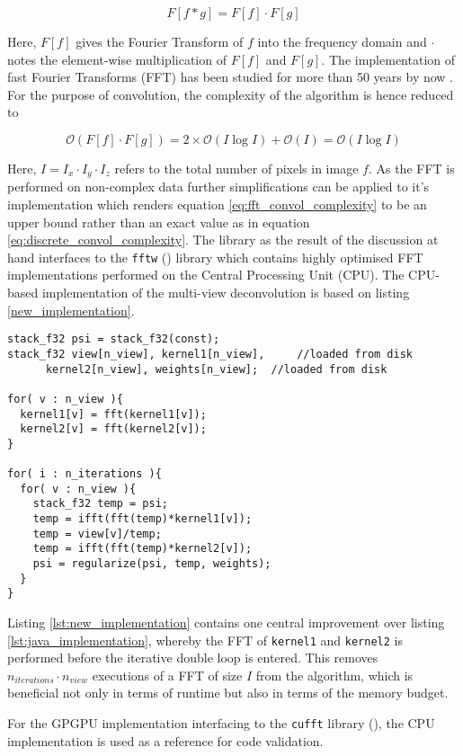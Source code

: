 \begin{equation}
  \label{eq:convol_theorem}
  F[f \ast g] = F[f] \cdot F[g]
\end{equation}

Here, $F[f]$ gives the Fourier Transform of $f$ into the frequency domain and $\cdot$ notes the element-wise multiplication of $F[f]$ and $F[g]$. The implementation of fast Fourier Transforms (FFT) has been studied for more than 50 years by now \cite{FFTCooleyTurkey,FFTBluestein,FFTRaders}. For the purpose of convolution, the complexity of the algorithm is hence reduced to 

\begin{equation}
  \label{eq:fft_convol_complexity}
  \mathcal{O}(F[f] \cdot F[g]) = 2\times\mathcal{O}(I\log I) + \mathcal{O}(I) = \mathcal{O}(I\log I)
\end{equation}

Here, $I = I_{x} \cdot I_{y} \cdot I_{z}$ refers to the total number of pixels in image $f$. As the FFT is performed on non-complex data further simplifications can be applied to it's implementation which renders equation \ref{eq:fft_convol_complexity} to be an upper bound rather than an exact value as in equation \ref{eq:discrete_convol_complexity}. The library as the result of the discussion at hand interfaces to the \texttt{fftw} (\cite{FFTW05}) library which contains highly optimised FFT implementations performed on the Central Processing Unit (CPU). The CPU-based implementation of the multi-view deconvolution is based on listing \ref{new_implementation}.

\begin{lstlisting}[caption={Optimized CPU Implementation of Multi-View Deconvolution. All FFT are explicitely stated \texttt{fft} as well as the corresponding normalized inverse operations \texttt{ifft}. },label={lst:new_implementation}]
stack_f32 psi = stack_f32(const);
stack_f32 view[n_view], kernel1[n_view],     //loaded from disk
	  kernel2[n_view], weights[n_view];  //loaded from disk

for( v : n_view ){
  kernel1[v] = fft(kernel1[v]);
  kernel2[v] = fft(kernel2[v]);
}

for( i : n_iterations ){
  for( v : n_view ){
    stack_f32 temp = psi;
    temp = ifft(fft(temp)*kernel1[v]);
    temp = view[v]/temp;
    temp = ifft(fft(temp)*kernel2[v]);
    psi = regularize(psi, temp, weights);
  }
}
\end{lstlisting}

Listing \ref{lst:new_implementation} contains one central improvement over listing \ref{lst:java_implementation}, whereby the FFT of \texttt{kernel1} and \texttt{kernel2} is performed before the iterative double loop is entered. This removes $n_{iterations}\cdot n_{view}$ executions of a FFT of size $I$ from the algorithm, which is beneficial not only in terms of runtime but also in terms of the memory budget.

For the GPGPU implementation interfacing to the \texttt{cufft} library (\cite{cufft}), the CPU implementation is used as a reference for code validation.

